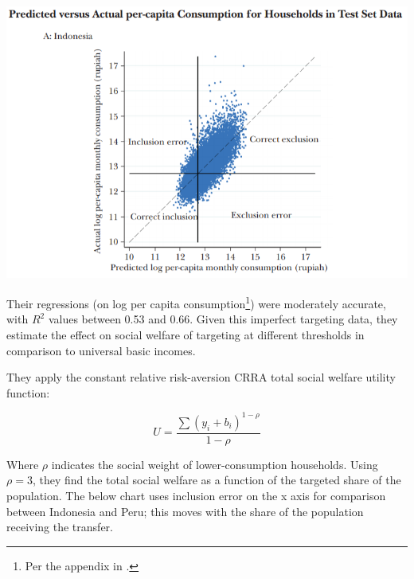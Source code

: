 \documentclass[12pt]{article}
\begin{document}
\begin{center}
	\includegraphics[width=15cm]{../img/hanna_olken_2018_pred_actual_cons}
	\label{fig:ho_pred_actual_cons}
\end{center}

Their regressions (on log per capita
consumption\footnote{Per the appendix in .})
were moderately accurate, with $R^2$ values between 0.53 and 0.66.
Given this imperfect targeting data, they estimate the effect on social
welfare of targeting at different thresholds in comparison to universal basic
incomes.

They apply the constant relative risk-aversion CRRA total social welfare 
utility function:

\begin{equation}
U = \frac{\sum{(y_i + b_i)^{1-\rho}}}{1-\rho}
\end{equation}

Where $\rho$ indicates the social weight of lower-consumption households.
Using $\rho = 3$, they find the total social welfare as a function 
of the targeted share of the population. The below chart uses inclusion error 
on the x axis for comparison between Indonesia and Peru; this moves with the 
share of the population receiving the transfer.
\end{document}
